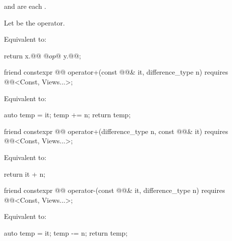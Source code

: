 \begin{itemdescr}
\pnum
\expects
{} and
 are each .

\pnum
Let  be the operator.

\pnum
\effects
Equivalent to:
\begin{codeblock}
return x.@@ @$op$@ y.@@;
\end{codeblock}
\end{itemdescr}

%
\begin{itemdecl}
friend constexpr @@ operator+(const @@& it, difference_type n)
  requires @@<Const, Views...>;
\end{itemdecl}

\begin{itemdescr}
\pnum
\effects
Equivalent to:
\begin{codeblock}
auto temp = it;
temp += n;
return temp;
\end{codeblock}
\end{itemdescr}

%
\begin{itemdecl}
friend constexpr @@ operator+(difference_type n, const @@& it)
  requires @@<Const, Views...>;
\end{itemdecl}

\begin{itemdescr}
\pnum
\effects
Equivalent to:
\begin{codeblock}
return it + n;
\end{codeblock}
\end{itemdescr}

%
\begin{itemdecl}
friend constexpr @@ operator-(const @@& it, difference_type n)
  requires @@<Const, Views...>;
\end{itemdecl}

\begin{itemdescr}
\pnum
\effects
Equivalent to:
\begin{codeblock}
auto temp = it;
temp -= n;
return temp;
\end{codeblock}
\end{itemdescr}

